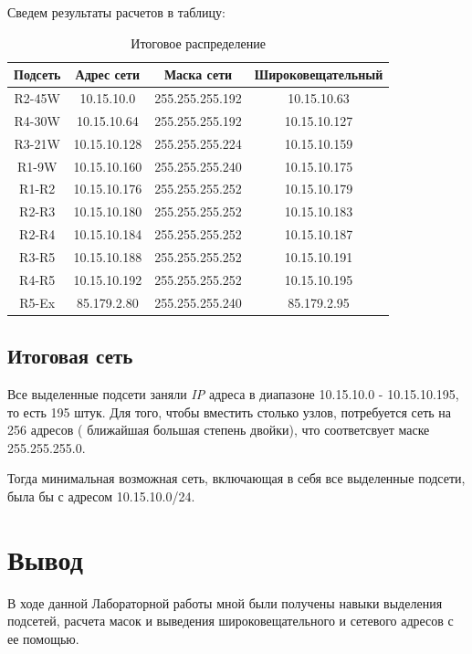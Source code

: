 \documentclass[a4paper]{article}
\begin{document}
  Сведем результаты расчетов в таблицу:
  \begin{table}[H]
    \centering
    \begin{tabular}{| c | c | c | c |}
      \hline
      Подсеть & Адрес сети & Маска сети & Широковещательный \\
      \hline
      R2-45W & 10.15.10.0 & 255.255.255.192 & 10.15.10.63 \\
      \hline
      R4-30W & 10.15.10.64 & 255.255.255.192 & 10.15.10.127 \\
      \hline
      R3-21W & 10.15.10.128 & 255.255.255.224 & 10.15.10.159 \\
      \hline
      R1-9W & 10.15.10.160 & 255.255.255.240 & 10.15.10.175 \\
      \hline
      R1-R2 & 10.15.10.176 & 255.255.255.252 & 10.15.10.179 \\
      \hline
      R2-R3 & 10.15.10.180 & 255.255.255.252 & 10.15.10.183 \\
      \hline
      R2-R4 & 10.15.10.184 & 255.255.255.252 & 10.15.10.187 \\
      \hline
      R3-R5 & 10.15.10.188 & 255.255.255.252 & 10.15.10.191 \\
      \hline
      R4-R5 & 10.15.10.192 & 255.255.255.252 & 10.15.10.195 \\
      \hline
      R5-Ex & 85.179.2.80 & 255.255.255.240 & 85.179.2.95 \\
      \hline
    \end{tabular}
    \caption{Итоговое распределение}
  \end{table}

  \subsection{Итоговая сеть}

  Все выделенные подсети заняли \textit{IP} адреса в диапазоне 10.15.10.0 - 10.15.10.195,
  то есть 195 штук. Для того, чтобы вместить столько узлов, потребуется сеть на 256 адресов (
  ближайшая большая степень двойки), что соответсвует маске 255.255.255.0.

  Тогда минимальная возможная сеть, включающая в себя все выделенные подсети, была бы
  с адресом 10.15.10.0/24.

  \newpage
  \section{Вывод}

  В ходе данной Лабораторной работы мной были получены навыки выделения подсетей, расчета
  масок и выведения широковещательного и сетевого адресов с ее помощью.
\end{document}
